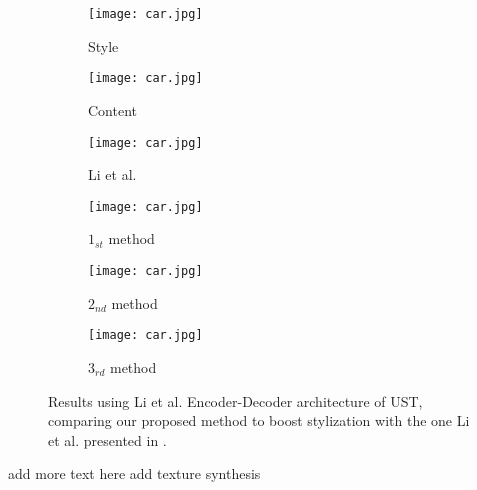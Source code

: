 \begin{figure}[h!]
\begin{subfigure}[b]{0.16\linewidth}
	\end{subfigure}
	\centering
	\begin{subfigure}[b]{0.16\linewidth}
		\texttt{[image: car.jpg]} %
		\caption{Style}
	\end{subfigure}
	\begin{subfigure}[b]{0.16\linewidth}
		\texttt{[image: car.jpg]} %
		\caption{Content}
	\end{subfigure}
	\begin{subfigure}[b]{0.16\linewidth}
		\texttt{[image: car.jpg]} %
		\caption{Li et al. \cite{bib11}}
	\end{subfigure}
	\begin{subfigure}[b]{0.16\linewidth}
		\texttt{[image: car.jpg]} %
		\caption{$1_{st}$ method}
	\end{subfigure}
	\begin{subfigure}[b]{0.16\linewidth}
		\texttt{[image: car.jpg]} %
		\caption{$2_{nd}$ method}
	\end{subfigure}
	\begin{subfigure}[b]{0.16\linewidth}
		\texttt{[image: car.jpg]} %
		\caption{$3_{rd}$ method}
	\end{subfigure}
		\caption{Results using Li et al. \cite{bib11} Encoder-Decoder architecture of UST, comparing our proposed method to boost stylization with the one Li et al. presented in \cite{bib11}.}
		\label{fig:Merge}
\end{figure}
add more text here
add texture synthesis 